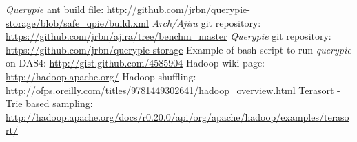 \begin{thebibliography}{99}
		{\emph{Querypie} ant build file: \url{http://github.com/jrbn/querypie-storage/blob/safe_qpie/build.xml}}
		{\emph{Arch/Ajira} git repository: \url{https://github.com/jrbn/ajira/tree/benchm_master}}
		{\emph{Querypie} git repository: \url{https://github.com/jrbn/querypie-storage}}
		{Example of bash script to run \emph{querypie} on DAS4: \url{http://gist.github.com/4585904}}
		{Hadoop wiki page: \url{http://hadoop.apache.org/}}
		{Hadoop shuffling: \url{http://ofps.oreilly.com/titles/9781449302641/hadoop_overview.html}}
		{Terasort - Trie based sampling: \url{http://hadoop.apache.org/docs/r0.20.0/api/org/apache/hadoop/examples/terasort/}}
\end{thebibliography}
